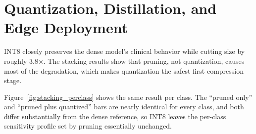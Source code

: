 \documentclass{article}
\begin{document}
\section{Quantization, Distillation, and Edge Deployment}
INT8 closely preserves the dense model's clinical behavior while cutting size by roughly 3.8$\times$. The stacking results show that pruning, not quantization, causes most of the degradation, which makes quantization the safest first compression stage.

\begin{table}[t]
\centering
\small
\caption{Selected quantization-stacking results from the personal multi-seed runs. Quantization is the safest size reduction, but pruning still controls the clinical tradeoff. Latency depends on the backend, so we do not base recommendations on it.}
\label{tab:stacking}
\end{table}

Figure~\ref{fig:stacking_perclass} shows the same result per class. The ``pruned only'' and ``pruned plus quantized'' bars are nearly identical for every class, and both differ substantially from the dense reference, so INT8 leaves the per-class sensitivity profile set by pruning essentially unchanged.
\end{document}
